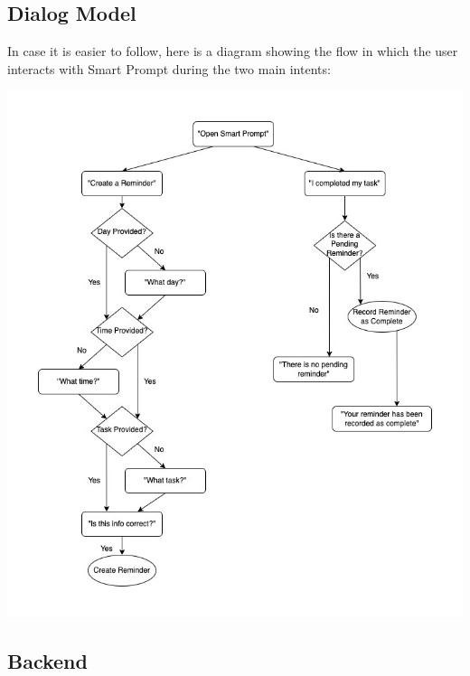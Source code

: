 \documentclass[11pt, oneside]{article}
\begin{document}
\subsection{Dialog Model}

In case it is easier to follow, here is a diagram showing the flow in which the user interacts with Smart Prompt during the two main intents: 
\begin{center}
  \includegraphics[width=\linewidth * 5/6]{images/dialogModel.jpg}
\end{center}

\subsection{Backend}
\end{document}
